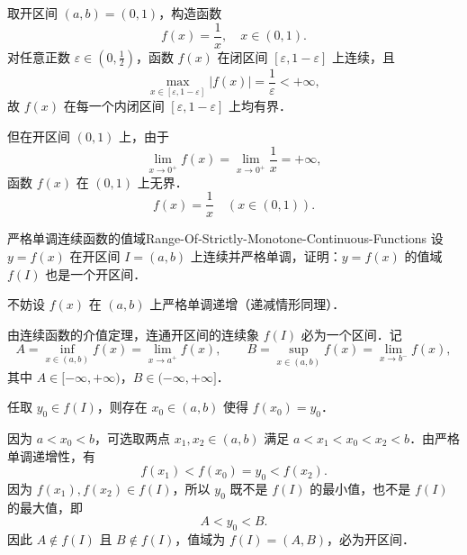 \begin{solution}
    取开区间 $(a, b) = (0, 1)$，构造函数
    \begin{equation}
        f(x) = \frac{1}{x}, \quad x \in (0, 1).
    \end{equation}
    对任意正数 $\varepsilon \in \left(0, \frac{1}{2}\right)$，函数 $f(x)$ 在闭区间 $[\varepsilon, 1 - \varepsilon]$ 上连续，且
    \begin{equation}
        \max_{x\in [\varepsilon, 1-\varepsilon]} |f(x)| = \frac{1}{\varepsilon} < +\infty,
    \end{equation}
    故 $f(x)$ 在每一个内闭区间 $[\varepsilon, 1 - \varepsilon]$ 上均有界．

    但在开区间 $(0, 1)$ 上，由于
    \begin{equation}
        \lim_{x\to 0^+} f(x) = \lim_{x\to 0^+} \frac{1}{x} = +\infty,
    \end{equation}
    函数 $f(x)$ 在 $(0, 1)$ 上无界．
    \begin{equation}
        \boxed{f(x) = \frac{1}{x} \quad (x \in (0, 1)).}
    \end{equation}
\end{solution}

\begin{problem}{严格单调连续函数的值域}{Range-Of-Strictly-Monotone-Continuous-Functions}
    设 $y = f(x)$ 在开区间 $I = (a, b)$ 上连续并严格单调，证明：$y = f(x)$ 的值域 $f(I)$ 也是一个开区间．
\end{problem}

\begin{myproof}
    不妨设 $f(x)$ 在 $(a, b)$ 上严格单调递增（递减情形同理）．

    由连续函数的介值定理，连通开区间的连续象 $f(I)$ 必为一个区间．记
    \begin{equation}
        A = \inf_{x\in (a, b)} f(x) = \lim_{x\to a^+} f(x), \qquad B = \sup_{x\in (a, b)} f(x) = \lim_{x\to b^-} f(x),
    \end{equation}
    其中 $A \in [-\infty, +\infty)$，$B \in (-\infty, +\infty]$．

    任取 $y_0 \in f(I)$，则存在 $x_0 \in (a, b)$ 使得 $f(x_0) = y_0$．

    因为 $a < x_0 < b$，可选取两点 $x_1, x_2 \in (a, b)$ 满足 $a < x_1 < x_0 < x_2 < b$．由严格单调递增性，有
    \begin{equation}
        f(x_1) < f(x_0) = y_0 < f(x_2).
    \end{equation}
    因为 $f(x_1), f(x_2) \in f(I)$，所以 $y_0$ 既不是 $f(I)$ 的最小值，也不是 $f(I)$ 的最大值，即
    \begin{equation}
        A < y_0 < B.
    \end{equation}
    因此 $A \notin f(I)$ 且 $B \notin f(I)$，值域为 $f(I) = (A, B)$，必为开区间．
\end{myproof}

